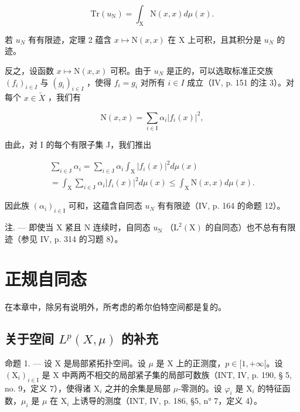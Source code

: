 \[
\mathrm{Tr} (u _ {\mathrm{N}}) = \int_ {\mathrm{X}} \mathrm{N} (x, x) d \mu (x).
\]

若 \(u_{N}\) 有有限迹，定理 2 蕴含 \(x \mapsto \mathrm{N}(x, x)\) 在 X 上可积，且其积分是 \(u_{N}\) 的迹。

反之，设函数 \(x \mapsto \mathrm{N}(x, x)\) 可积。由于 \(u_{N}\) 是正的，可以选取标准正交族 \((f_i)_{i \in I}\) 与 \((g_i)_{i \in I}\) ，使得 \(f_i = g_i\) 对所有 \(i \in I\) 成立（IV, p. 151 的注 3）。对每个 \(x \in \widetilde{X}\) ，我们有

\[
\mathrm{N} (x, x) = \sum_ {i \in \mathrm{I}} \alpha_ {i} | f _ {i} (x) | ^ {2},
\]

由此，对 I 的每个有限子集 J，我们推出

\[
\begin{array}{c} \sum_ {i \in \mathrm{J}} \alpha_ {i} = \sum_ {i \in \mathrm{J}} \alpha_ {i} \int_ {\mathrm{X}} | f _ {i} (x) | ^ {2} d \mu (x) \\ = \int_ {\mathrm{X}} \sum_ {i \in \mathrm{J}} \alpha_ {i} | f _ {i} (x) | ^ {2} d \mu (x) \leqslant \int_ {\mathrm{X}} \mathrm{N} (x, x) d \mu (x). \end{array}
\]

因此族 \((\alpha_{i})_{i\in\mathrm{I}}\) 可和，这蕴含自同态 \(u_{N}\) 有有限迹（IV, p. 164 的命题 12）。

注. --- 即使当 X 紧且 N 连续时，自同态 \(u_{\mathrm{N}}\) （\(\mathrm{L}^{2}(\mathrm{X})\) 的自同态）也不总有有限迹（参见 IV, p. 314 的习题 8）。

\section{正规自同态}

在本章中，除另有说明外，所考虑的希尔伯特空间都是复的。

\subsection{\texorpdfstring{关于空间 \(L^{p}(X,\mu)\) 的补充}{关于空间 L\^{}\{p\}(X,\textbackslash mu) 的补充}}

命题 1. --- 设 X 是局部紧拓扑空间。设 \(\mu\) 是 X 上的正测度，\(p \in [1, +\infty[\)。设 \((\mathrm{X}_i)_{i \in \mathrm{I}}\) 是 X 中两两不相交的局部紧子集的局部可数族（INT, IV, p. 190, § 5, no. 9，定义 7），使得诸 \(\mathrm{X}_i\) 之并的余集是局部 \(\mu\)-零测的。设 \(\varphi_i\) 是 \(\mathrm{X}_i\) 的特征函数，\(\mu_i\) 是 \(\mu\) 在 \(\mathrm{X}_i\) 上诱导的测度（INT, IV, p. 186, §5, n° 7，定义 4）。

